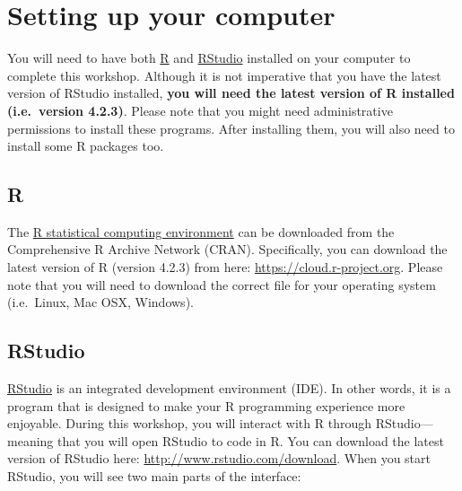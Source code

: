 \documentclass[12pt,]{book}
\begin{document}
\hypertarget{setup}{%
\section{Setting up your computer}\label{setup}}

You will need to have both \href{https://www.r-project.org}{R} and \href{https://www.rstudio.com/}{RStudio} installed on your computer to complete this workshop. Although it is not imperative that you have the latest version of RStudio installed, \textbf{you will need the latest version of R installed (i.e.~version 4.2.3)}. Please note that you might need administrative permissions to install these programs. After installing them, you will also need to install some R packages too.

\hypertarget{r}{%
\subsection{R}\label{r}}

The \href{https://www.r-project.org}{R statistical computing environment} can be downloaded from the Comprehensive R Archive Network (CRAN). Specifically, you can download the latest version of R (version 4.2.3) from here: \url{https://cloud.r-project.org}. Please note that you will need to download the correct file for your operating system (i.e.~Linux, Mac OSX, Windows).

\hypertarget{rstudio}{%
\subsection{RStudio}\label{rstudio}}

\href{https://www.rstudio.com}{RStudio} is an integrated development environment (IDE). In other words, it is a program that is designed to make your R programming experience more enjoyable. During this workshop, you will interact with R through RStudio---meaning that you will open RStudio to code in R. You can download the latest version of RStudio here: \url{http://www.rstudio.com/download}. When you start RStudio, you will see two main parts of the interface:
\end{document}

